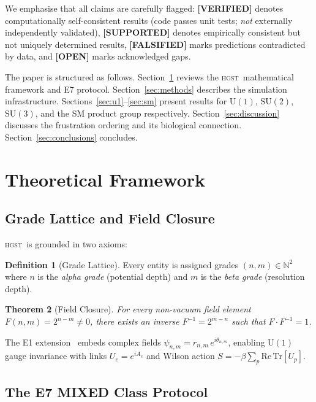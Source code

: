 \documentclass[12pt,a4paper]{article}
\newcommand{\hgst}{\textsc{hgst}}
\newcommand{\SU}[1]{\mathrm{SU}(#1)}
\newcommand{\UN}[1]{\mathrm{U}(#1)}
\newcommand{\validated}{\textcolor{green!55!black}{\textbf{[VERIFIED]}}}
\newcommand{\supported}{\textcolor{blue!70!black}{\textbf{[SUPPORTED]}}}
\newcommand{\falsified}{\textcolor{red!70!black}{\textbf{[FALSIFIED]}}}
\newcommand{\open}{\textcolor{orange!70!black}{\textbf{[OPEN]}}}
\theoremstyle{plain}
\newtheorem{theorem}{Theorem}[section]
\theoremstyle{definition}
\newtheorem{definition}[theorem]{Definition}
\theoremstyle{remark}
\begin{document}
We emphasise that all claims are carefully flagged:
\validated{} denotes computationally self-consistent results (code passes unit tests;
\emph{not} externally independently validated),
\supported{} denotes empirically consistent but not uniquely determined results,
\falsified{} marks predictions contradicted by data, and \open{} marks acknowledged gaps.

The paper is structured as follows.
Section~\ref{sec:framework} reviews the \hgst\ mathematical framework and E7 protocol.
Section~\ref{sec:methods} describes the simulation infrastructure.
Sections~\ref{sec:u1}--\ref{sec:sm} present results for $\UN{1}$,
$\SU{2}$, $\SU{3}$, and the SM product group respectively.
Section~\ref{sec:discussion} discusses the frustration ordering and its biological
connection.
Section~\ref{sec:conclusions} concludes.

\section{Theoretical Framework}
\label{sec:framework}

\subsection{Grade Lattice and Field Closure}

\hgst\ is grounded in two axioms:

\begin{definition}[Grade Lattice]
Every entity is assigned grades $(n,m)\in\mathbb{N}^2$ where $n$ is the \emph{alpha grade}
(potential depth) and $m$ is the \emph{beta grade} (resolution depth).
\end{definition}

\begin{theorem}[Field Closure]
For every non-vacuum field element $F(n,m)=2^{n-m}\neq 0$, there exists an inverse
$F^{-1}=2^{m-n}$ such that $F\cdot F^{-1}=1$.
\end{theorem}

The E1 extension~\citep{HGST_E1} embeds complex fields
$\psi_{n,m}=r_{n,m}\,e^{i\theta_{n,m}}$, enabling $\UN{1}$ gauge invariance with links
$U_e=e^{iA_e}$ and Wilson action $S=-\beta\sum_p \mathrm{Re}\,\mathrm{Tr}[U_p]$.

\subsection{The E7 MIXED Class Protocol}
\end{document}
